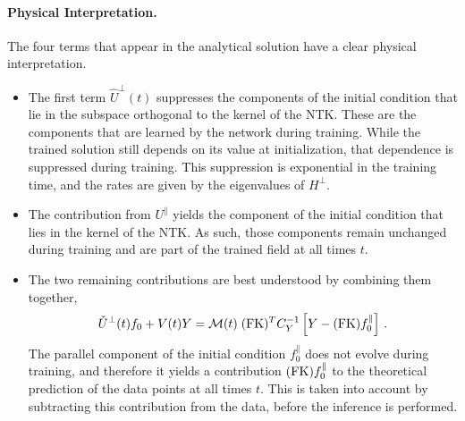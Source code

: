\paragraph{Physical Interpretation.} The four terms that appear in the analytical solution have a clear physical interpretation. 
\begin{itemize}
    \item The first term $\hat{U}^\perp(t)$ suppresses the components of the initial condition that lie in the subspace orthogonal 
    to the kernel of the NTK. These are the components that are learned by the network during training. While the trained solution
    still depends on its value at initialization, that dependence is suppressed during training. This suppression 
    is exponential in the training time, and the rates are given by the eigenvalues of 
    $H^{\perp}$.
    \item The contribution from $U^\parallel$ yields the component of the initial condition that lies in the kernel of the NTK. 
    As such, those components remain unchanged during training and are part of the trained field at all times $t$. 
    \item The two remaining contributions are best understood by combining them together,
    \begin{align}
        \label{eq:DataCorrectedInference}
        \check{U}^{\perp}(t) f_{0} + V(t) Y 
            = \mathcal{M}(t)\; (\mathrm{FK})^T C_Y^{-1} \left[Y - (\mathrm{FK}) f_{0}^{\parallel}\right]\, .
    \end{align}
    The parallel component of the initial condition $f_{0}^{\parallel}$ does not evolve during training, and therefore it yields
    a contribution $(\mathrm{FK}) f_{0}^{\parallel}$ to the theoretical prediction of the data points at all times $t$. This is 
    taken into account by subtracting this
    contribution from the data, before the inference is performed.
\end{itemize}

